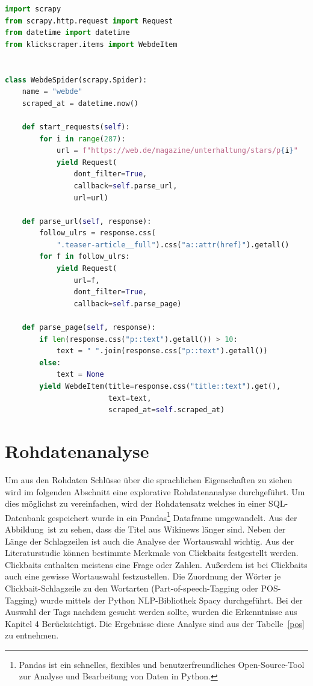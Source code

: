 \begin{lstlisting}[language=Python,caption=Beispiel eines Scrapers,label={Scrapy}]
import scrapy
from scrapy.http.request import Request
from datetime import datetime
from klickscraper.items import WebdeItem


class WebdeSpider(scrapy.Spider):
    name = "webde"
    scraped_at = datetime.now()

    def start_requests(self):
        for i in range(287):
            url = f"https://web.de/magazine/unterhaltung/stars/p{i}"
            yield Request(
                dont_filter=True,
                callback=self.parse_url,
                url=url)

    def parse_url(self, response):
        follow_ulrs = response.css(
            ".teaser-article__full").css("a::attr(href)").getall()
        for f in follow_ulrs:
            yield Request(
                url=f,
                dont_filter=True,
                callback=self.parse_page)

    def parse_page(self, response):
        if len(response.css("p::text").getall()) > 10:
            text = " ".join(response.css("p::text").getall())
        else:
            text = None
        yield WebdeItem(title=response.css("title::text").get(),
                        text=text,
                        scraped_at=self.scraped_at)
\end{lstlisting}


\section{Rohdatenanalyse}
Um aus den Rohdaten Schlüsse über die sprachlichen Eigenschaften zu ziehen wird im folgenden Abschnitt eine explorative Rohdatenanalyse durchgeführt. Um dies möglichst zu vereinfachen, wird der Rohdatensatz welches in einer SQL-Datenbank gespeichert wurde in ein Pandas\footnote{Pandas ist ein schnelles, flexibles und benutzerfreundliches Open-Source-Tool zur Analyse und Bearbeitung von Daten in Python.} Dataframe umgewandelt.
Aus der Abbildung~ist zu sehen, dass die Titel aus Wikinews länger sind. Neben der Länge der Schlagzeilen ist auch die Analyse der Wortauswahl wichtig. Aus der Literaturstudie können bestimmte Merkmale von Clickbaits festgestellt werden. Clickbaits enthalten meistens eine Frage oder Zahlen. Außerdem ist bei Clickbaits auch eine gewisse Wortauswahl festzustellen. Die Zuordnung der Wörter je Clickbait-Schlagzeile zu den Wortarten (Part-of-speech-Tagging oder POS-Tagging) wurde mittels der Python NLP-Bibliothek Spacy durchgeführt. Bei der Auswahl der Tags nachdem gesucht werden sollte, wurden die Erkenntnisse aus Kapitel 4 Berücksichtigt. Die Ergebnisse diese Analyse sind aus der Tabelle~\ref{pos} zu entnehmen.

